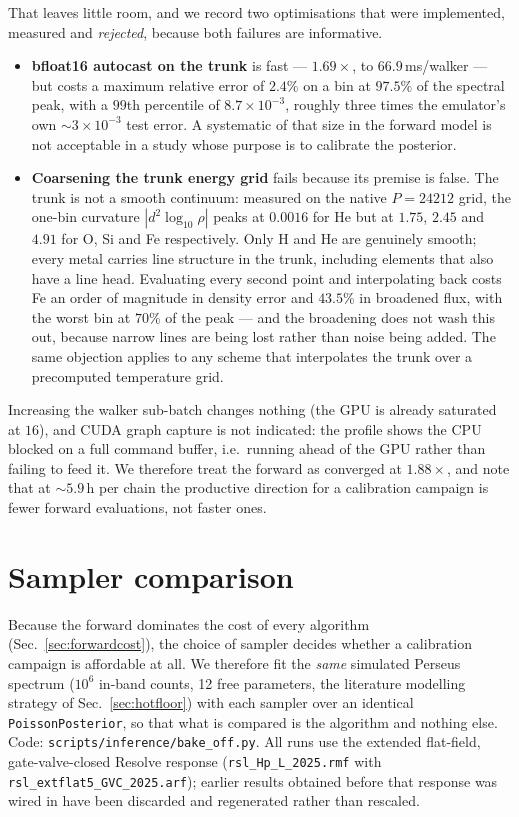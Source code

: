 \documentclass[11pt,a4paper]{article}
\newcommand{\code}[1]{\texttt{#1}}
\begin{document}
That leaves little room, and we record two optimisations that were implemented,
measured and \emph{rejected}, because both failures are informative.
\begin{itemize}
\item \textbf{bfloat16 autocast on the trunk} is fast --- $1.69\times$, to
$66.9\,$ms/walker --- but costs a maximum relative error of $2.4\%$ on a bin at
$97.5\%$ of the spectral peak, with a $99$th percentile of $8.7\times10^{-3}$,
roughly three times the emulator's own ${\sim}3\times10^{-3}$ test error. A
systematic of that size in the forward model is not acceptable in a study whose
purpose is to calibrate the posterior.
\item \textbf{Coarsening the trunk energy grid} fails because its premise is
false. The trunk is not a smooth continuum: measured on the native
$P=24212$ grid, the one-bin curvature $|d^2\log_{10}\rho|$ peaks at $0.0016$ for
He but at $1.75$, $2.45$ and $4.91$ for O, Si and Fe respectively. Only H and He
are genuinely smooth; every metal carries line structure in the trunk, including
elements that also have a line head. Evaluating every second point and
interpolating back costs Fe an order of magnitude in density error and $43.5\%$
in broadened flux, with the worst bin at $70\%$ of the peak --- and the
broadening does not wash this out, because narrow lines are being lost rather
than noise being added. The same objection applies to any scheme that
interpolates the trunk over a precomputed temperature grid.
\end{itemize}
Increasing the walker sub-batch changes nothing (the GPU is already saturated at
$16$), and CUDA graph capture is not indicated: the profile shows the CPU
blocked on a full command buffer, i.e.\ running ahead of the GPU rather than
failing to feed it. We therefore treat the forward as converged at
$1.88\times$, and note that at ${\sim}5.9\,$h per chain the productive direction
for a calibration campaign is fewer forward evaluations, not faster ones.

\section{Sampler comparison}\label{sec:bakeoff}
Because the forward dominates the cost of every algorithm
(Sec.~\ref{sec:forwardcost}), the choice of sampler decides whether a
calibration campaign is affordable at all. We therefore fit the \emph{same}
simulated Perseus spectrum ($10^{6}$ in-band counts, 12 free parameters, the
literature modelling strategy of Sec.~\ref{sec:hotfloor}) with each sampler over
an identical \code{PoissonPosterior}, so that what is compared is the algorithm
and nothing else. Code: \code{scripts/inference/bake\_off.py}. All runs use the
extended flat-field, gate-valve-closed Resolve response
(\code{rsl\_Hp\_L\_2025.rmf} with \code{rsl\_extflat5\_GVC\_2025.arf}); earlier
results obtained before that response was wired in have been discarded and
regenerated rather than rescaled.
\end{document}
